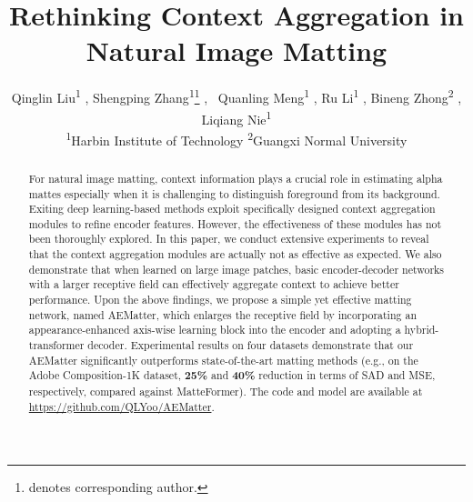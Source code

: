 \documentclass[10pt,twocolumn,letterpaper]{article}
\begin{document}
\title{Rethinking Context Aggregation in Natural Image Matting}

\author{Qinglin Liu\textsuperscript{1} ,
Shengping Zhang\textsuperscript{1}\thanks{denotes corresponding author. } ,
\ Quanling Meng\textsuperscript{1} ,
Ru Li\textsuperscript{1} ,
Bineng Zhong\textsuperscript{2} ,
Liqiang Nie\textsuperscript{1} \\
\textsuperscript{1}Harbin Institute of Technology \qquad \textsuperscript{2}Guangxi Normal University
}

\maketitle
\begin{abstract}
For natural image matting, context information plays a crucial role in estimating alpha mattes especially when it is challenging to distinguish foreground from its background.
Exiting deep learning-based methods exploit specifically designed context aggregation modules to refine encoder features. 
However, the effectiveness of these modules has not been thoroughly explored. 
In this paper, we conduct extensive experiments to reveal that the context aggregation modules are actually not as effective as expected. 
We also demonstrate that when learned on large image patches, basic encoder-decoder networks with a larger receptive field can effectively aggregate context to achieve better performance.
Upon the above findings, we propose a simple yet effective matting network, named AEMatter, which enlarges the receptive field by incorporating an appearance-enhanced axis-wise learning block into the encoder and adopting a hybrid-transformer decoder. 
Experimental results on four datasets demonstrate that our AEMatter significantly outperforms state-of-the-art matting methods (e.g., on the Adobe Composition-1K dataset, \textbf{25\%} and \textbf{40\%} reduction in terms of SAD and MSE, respectively, compared against MatteFormer). 
The code and model are available at \url{https://github.com/QLYoo/AEMatter}.



\end{abstract}
\end{document}
